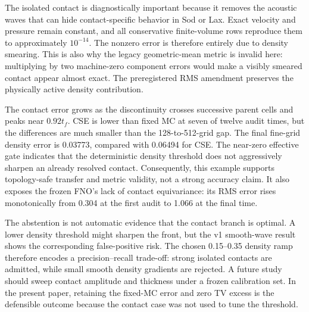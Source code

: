 \documentclass[10pt,twocolumn]{article}
\begin{document}
The isolated contact is diagnostically important because it removes the acoustic waves that can hide contact-specific behavior in Sod or Lax. Exact velocity and pressure remain constant, and all conservative finite-volume rows reproduce them to approximately $10^{-14}$. The nonzero error is therefore entirely due to density smearing. This is also why the legacy geometric-mean metric is invalid here: multiplying by two machine-zero component errors would make a visibly smeared contact appear almost exact. The preregistered RMS amendment preserves the physically active density contribution.

The contact error grows as the discontinuity crosses successive parent cells and peaks near $0.92t_f$. CSE is lower than fixed MC at seven of twelve audit times, but the differences are much smaller than the 128-to-512-grid gap. The final fine-grid density error is 0.03773, compared with 0.06494 for CSE. The near-zero effective gate indicates that the deterministic density threshold does not aggressively sharpen an already resolved contact. Consequently, this example supports topology-safe transfer and metric validity, not a strong accuracy claim. It also exposes the frozen FNO's lack of contact equivariance: its RMS error rises monotonically from 0.304 at the first audit to 1.066 at the final time.

The abstention is not automatic evidence that the contact branch is optimal. A lower density threshold might sharpen the front, but the v1 smooth-wave result shows the corresponding false-positive risk. The chosen 0.15--0.35 density ramp therefore encodes a precision--recall trade-off: strong isolated contacts are admitted, while small smooth density gradients are rejected. A future study should sweep contact amplitude and thickness under a frozen calibration set. In the present paper, retaining the fixed-MC error and zero TV excess is the defensible outcome because the contact case was not used to tune the threshold.
\end{document}
